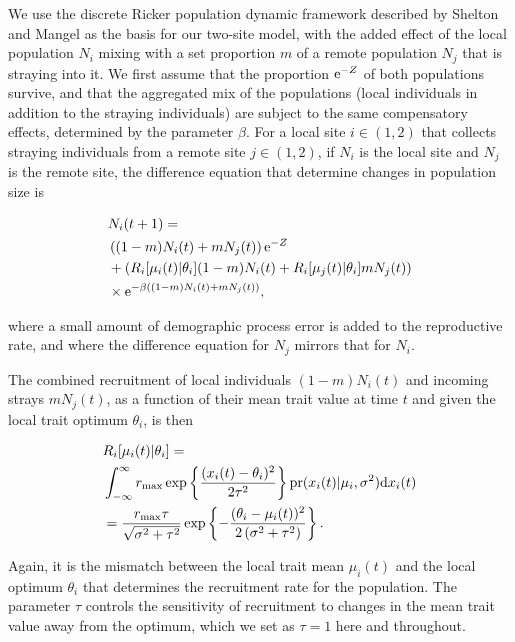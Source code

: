 \documentclass[twocolumn,preprintnumbers,amsmath,amssymb,superscriptaddress]{revtex4}
\begin{document}
We use the discrete Ricker population dynamic framework described by Shelton and Mangel \cite{Shelton:2011eq} as the basis for our two-site model, with the added effect of the local population $N_i$ mixing with a set proportion $m$ of a remote population $N_j$ that is straying into it.
We first assume that the proportion ${\rm e}^{-Z}$ of both populations survive, and that the aggregated mix of the populations (local individuals in addition to the straying individuals) are subject to the same compensatory effects, determined by the parameter $\beta$.
For a local site $i\in(1,2)$ that collects straying individuals from a remote site $j\in(1,2)$, if $N_i$ is the local site and $N_j$ is the remote site, the difference equation that determine changes in population size is

\begin{align}
  &N_i(t+1) = \\ \nonumber
  &\left((1-m)N_i(t) + m N_j(t) \right){\rm e}^{-Z} \\ \nonumber
  &+ \left(R_i[\mu_i(t)|\theta_i] (1-m)N_i(t) + R_i[\mu_j(t)|\theta_i] m N_j(t)\right) \\ \nonumber
  &\times {\rm e}^{-\beta ((1-m)N_i(t) + m N_j(t))},
  \label{eq:N}
\end{align}

\noindent where a small amount of demographic process error is added to the reproductive rate, and where the difference equation for $N_j$ mirrors that for $N_i$.

The combined recruitment of local individuals $(1-m)N_i(t)$ and incoming strays $mN_j(t)$, as a function of their mean trait value at time $t$ and given the local trait optimum $\theta_i$, is then

\begin{align}
  &R_i[\mu_i(t)|\theta_i] = \\ \nonumber
  &\int_{-\infty}^\infty r_{\rm max}\exp\left\{\frac{(x_i(t)-\theta_i)^2}{2\tau^2}\right\} {\rm pr}(x_i(t)|\mu_i,\sigma^2) {\rm d}x_i(t) \\ \nonumber
  &= \frac{r_{\rm max} \tau  }{\sqrt{\sigma ^2+\tau ^2}}\exp\left\{-\frac{(\theta_i-\mu_i(t))^2}{2 \left(\sigma ^2+\tau ^2\right)}\right\}.
  \label{eq:R}
\end{align}

\noindent Again, it is the mismatch between the local trait mean $\mu_i(t)$ and the local optimum $\theta_i$ that determines the recruitment rate for the population.
The parameter $\tau$ controls the sensitivity of recruitment to changes in the mean trait value away from the optimum, which we set as $\tau=1$ here and throughout.
\end{document}
